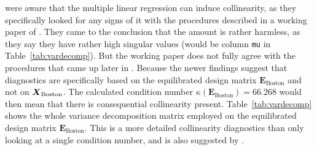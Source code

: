 \documentclass[11pt,a4paper,twoside]{book}\usepackage[]{graphicx}\usepackage[]{xcolor}
\begin{document}
\cite{Harrison1978} were aware that the multiple linear regression can induce collinearity, as they specifically looked for any signs of it with the procedures described in a working paper of \cite{BelsleyKlema1974}. They came to the conclusion that the amount is rather harmless, as they say they have rather high singular values (would be column \texttt{mu} in Table~\ref{tab:vardecomp}). But the working paper does not fully agree with the procedures that came up later in \cite{Belsley1980}. Because the newer findings suggest that diagnostics are specifically based on the equilibrated design matrix $\boldsymbol{E}_\text{Boston}$ and not on ${\boldsymbol{X}}_\text{Boston}$. The calculated condition number $\kappa\left(\boldsymbol{E}_\text{Boston}\right)=66.268$ would then mean that there is consequential collinearity present. Table~\ref{tab:vardecomp} shows the whole variance decomposition matrix employed on the equilibrated design matrix $\boldsymbol{E}_\text{Boston}$. This is a more detailed collinearity diagnostics than only looking at a single condition number, and is also suggested by \cite{Belsley1980}.
\end{document}
